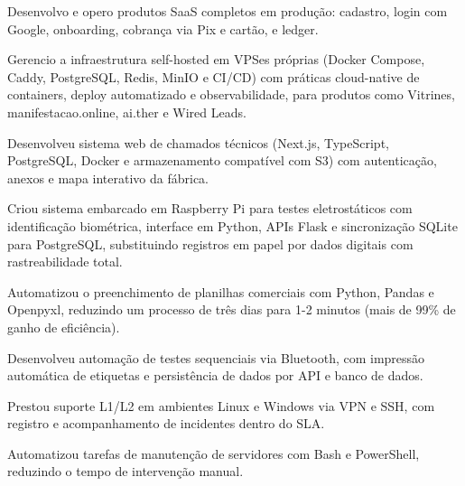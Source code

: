 \begin{cvbullets}
  \item Desenvolvo e opero produtos SaaS completos em produção: cadastro, login com Google, onboarding, cobrança via Pix e cartão, e ledger.
  \item Gerencio a infraestrutura self-hosted em VPSes próprias (Docker Compose, Caddy, PostgreSQL, Redis, MinIO e CI/CD) com práticas cloud-native de containers, deploy automatizado e observabilidade, para produtos como Vitrines, manifestacao.online, ai.ther e Wired Leads.
\end{cvbullets}

\begin{cvbullets}
  \item Desenvolveu sistema web de chamados técnicos (Next.js, TypeScript, PostgreSQL, Docker e armazenamento compatível com S3) com autenticação, anexos e mapa interativo da fábrica.
  \item Criou sistema embarcado em Raspberry Pi para testes eletrostáticos com identificação biométrica, interface em Python, APIs Flask e sincronização SQLite para PostgreSQL, substituindo registros em papel por dados digitais com rastreabilidade total.
  \item Automatizou o preenchimento de planilhas comerciais com Python, Pandas e Openpyxl, reduzindo um processo de três dias para 1-2 minutos (mais de 99\% de ganho de eficiência).
  \item Desenvolveu automação de testes sequenciais via Bluetooth, com impressão automática de etiquetas e persistência de dados por API e banco de dados.
\end{cvbullets}

\begin{cvbullets}
  \item Prestou suporte L1/L2 em ambientes Linux e Windows via VPN e SSH, com registro e acompanhamento de incidentes dentro do SLA.
  \item Automatizou tarefas de manutenção de servidores com Bash e PowerShell, reduzindo o tempo de intervenção manual.
\end{cvbullets}


